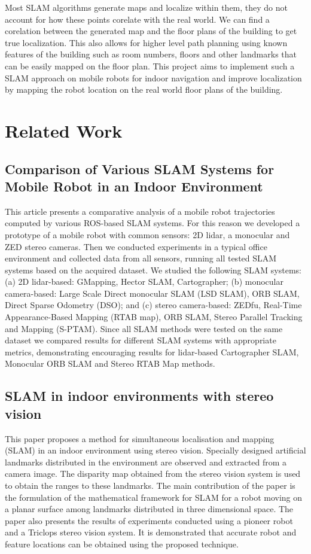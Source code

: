 \documentclass[conference, letterpaper]{IEEEtran}
\begin{document}
Most SLAM algorithms generate maps and localize within them, they do not 
account for how these points corelate with the real world. We can find a 
corelation between the generated map and the floor plans of the building
to get true localization. This also allows for higher level path 
planning using known features of the building such as room numbers, 
floors and other landmarks that can be easily mapped on the floor plan.   
This project aims to implement such a SLAM approach on mobile robots for 
indoor navigation and improve localization by mapping the robot location 
on the real world floor plans of the building.

\section{Related Work}

\subsection{Comparison of Various SLAM Systems for Mobile Robot in an Indoor Environment}
This article presents a comparative analysis of a mobile robot trajectories computed by various ROS-based SLAM systems. For this reason we developed a prototype of a mobile robot with common sensors: 2D lidar, a monocular and ZED stereo cameras. Then we conducted experiments in a typical office environment and collected data from all sensors, running all tested SLAM systems based on the acquired dataset. We studied the following SLAM systems: (a) 2D lidar-based: GMapping, Hector SLAM, Cartographer; (b) monocular camera-based: Large Scale Direct monocular SLAM (LSD SLAM), ORB SLAM, Direct Sparse Odometry (DSO); and (c) stereo camera-based: ZEDfu, Real-Time Appearance-Based Mapping (RTAB map), ORB SLAM, Stereo Parallel Tracking and Mapping (S-PTAM). Since all SLAM methods were tested on the same dataset we compared results for different SLAM systems with appropriate metrics, demonstrating encouraging results for lidar-based Cartographer SLAM, Monocular ORB SLAM and Stereo RTAB Map methods.

\subsection{SLAM in indoor environments with stereo vision}
This paper proposes a method for simultaneous localisation and mapping (SLAM) in an indoor environment using stereo vision. Specially designed artificial landmarks distributed in the environment are observed and extracted from a camera image. The disparity map obtained from the stereo vision system is used to obtain the ranges to these landmarks. The main contribution of the paper is the formulation of the mathematical framework for SLAM for a robot moving on a planar surface among landmarks distributed in three dimensional space. The paper also presents the results of experiments conducted using a pioneer robot and a Triclops stereo vision system. It is demonstrated that accurate robot and feature locations can be obtained using the proposed technique.
\end{document}
